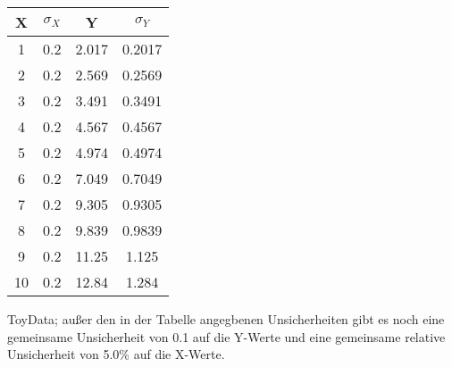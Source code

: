 \begin{tabular}{cccc}
\hline
X & $\sigma_X$ & Y & $\sigma_Y$\\
\hline
1 & 0.2 & 2.017 & 0.2017\\
2 & 0.2 & 2.569 & 0.2569\\
3 & 0.2 & 3.491 & 0.3491\\
4 & 0.2 & 4.567 & 0.4567\\
5 & 0.2 & 4.974 & 0.4974\\
6 & 0.2 & 7.049 & 0.7049\\
7 & 0.2 & 9.305 & 0.9305\\
8 & 0.2 & 9.839 & 0.9839\\
9 & 0.2 & 11.25 & 1.125\\
10 & 0.2 & 12.84 & 1.284\\

\hline
\end{tabular}
\caption{ToyData; außer den in der Tabelle angegbenen Unsicherheiten gibt es noch eine gemeinsame Unsicherheit von 0.1 auf die Y-Werte und eine gemeinsame relative Unsicherheit von 5.0\% auf die X-Werte.}
